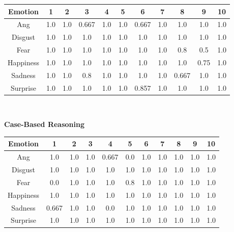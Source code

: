 \documentclass[a4paper]{article}
\begin{document}
\begin{center}
  \begin{tabular}{|c|cccccccccc|}
  \hline
    Emotion & 1 & 2 & 3 & 4 & 5 & 6 & 7 & 8 & 9 & 10 \\
    \hline
    Ang & 1.0 & 1.0 & 0.667 & 1.0 & 1.0 & 0.667 & 1.0 & 1.0 & 1.0 & 1.0 \\
Disgust & 1.0 & 1.0 & 1.0 & 1.0 & 1.0 & 1.0 & 1.0 & 1.0 & 1.0 & 1.0 \\
Fear & 1.0 & 1.0 & 1.0 & 1.0 & 1.0 & 1.0 & 1.0 & 0.8 & 0.5 & 1.0 \\
Happiness & 1.0 & 1.0 & 1.0 & 1.0 & 1.0 & 1.0 & 1.0 & 1.0 & 0.75 & 1.0 \\
Sadness & 1.0 & 1.0 & 0.8 & 1.0 & 1.0 & 1.0 & 1.0 & 0.667 & 1.0 & 1.0 \\
Surprise & 1.0 & 1.0 & 1.0 & 1.0 & 1.0 & 0.857 & 1.0 & 1.0 & 1.0 & 1.0 \\
	\hline
  \end{tabular}\\
  \end{center} 
  
 {\bf Case-Based Reasoning}\\

\begin{center}
  \begin{tabular}{|c|cccccccccc|}
  \hline
    Emotion & 1 & 2 & 3 & 4 & 5 & 6 & 7 & 8 & 9 & 10 \\
    \hline
    Ang & 1.0 & 1.0 & 1.0 & 0.667 &0.0& 1.0 & 1.0 & 1.0 & 1.0 & 1.0 \\
Disgust & 1.0 & 1.0 & 1.0 & 1.0 & 1.0 & 1.0 & 1.0 & 1.0 & 1.0 & 1.0 \\
Fear 	&0.0& 1.0 & 1.0 & 1.0 & 0.8 & 1.0 & 1.0 & 1.0 & 1.0 & 1.0 \\
Happiness & 1.0 & 1.0 & 1.0 & 1.0 & 1.0 & 1.0 & 1.0 & 1.0 & 1.0 & 1.0 \\
Sadness & 0.667 & 1.0 & 1.0 &0.0& 1.0 & 1.0 & 1.0 & 1.0 & 1.0 & 1.0 \\
Surprise & 1.0 & 1.0 & 1.0 & 1.0 & 1.0 & 1.0 & 1.0 & 1.0 & 1.0 & 1.0 \\
	\hline
  \end{tabular}\\
  \end{center} 
 
\end{document}
